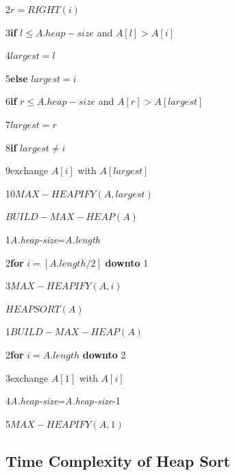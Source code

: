 \documentclass[9 pt]{report}
\begin{document}
2\hspace{0.5cm}$r=RIGHT(i)$

3\hspace{0.5cm}\textbf{if} $l \leq A.heap-size$ and $A[l]>A[i]$

4\hspace{1cm}$largest=l$

5\hspace{0.5cm}\textbf{else} $largest=i$

6\hspace{0.5cm}\textbf{if} $r \leq A.heap-size$ and $A[r]>A[largest]$

7\hspace{1cm}$largest=r$

8\hspace{0.5cm}\textbf{if} $largest \neq i$

9\hspace{1cm}exchange $A[i]$ with $A[largest]$

10\hspace{1cm}$MAX-HEAPIFY(A,largest)$

\vspace{1cm}

$BUILD-MAX-HEAP(A)$

1\hspace{0.5cm}\textit{A.heap-size}=\textit{A.length}

2\hspace{0.5cm}\textbf{for} $i=[A.length/2]$ \textbf{downto} 1

3\hspace{1cm}$MAX-HEAPIFY(A,i)$

\vspace{1cm}

$HEAPSORT(A)$

1\hspace{0.5cm}$BUILD-MAX-HEAP(A)$

2\hspace{0.5cm}\textbf{for} $i=A.length$ \textbf{downto} 2

3\hspace{1cm}exchange $A[1]$ with $A[i]$

4\hspace{1cm}\textit{A.heap-size}=\textit{A.heap-size}-1

5\hspace{1cm}$MAX-HEAPIFY(A,1)$

\subsection{\huge Time Complexity of Heap Sort}
\end{document}
